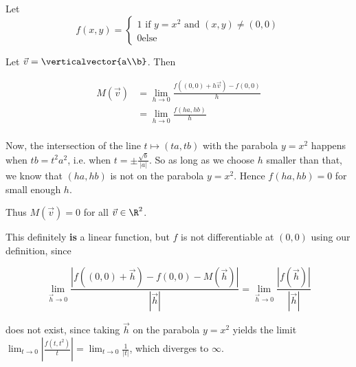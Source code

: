 \documentclass{ximera}
\begin{document}
	\begin{free-response}
	Let 
	\[f(x,y) = \begin{cases}
			1 \text{ if $y=x^2$ and $(x,y) \neq (0,0)$}\\
			0 \text{else}
		\end{cases}\]
		
	Let $\vec{v} = \verticalvector{a\\b}$.  Then 
	
	\begin{align*}
			M(\vec{v}) &= \lim_{h \to 0}\frac{f((0,0)+h\vec{v}) - f(0,0)}{h}\\
							&= \lim_{h \to 0}\frac{f(ha,hb)}{h}\\
		\end{align*}
		
		Now, the intersection of the line $t \mapsto (ta,tb)$ with the parabola $y=x^2$ happens when $tb = t^2a^2$, i.e. when $t = \pm \frac{\sqrt{b}}{|a|}$.  So as long as
		we choose $h$ smaller than that, we know that $(ha,hb)$ is not on the parabola $y=x^2$.  Hence $f(ha,hb) = 0$ for small enough $h$.
		
		Thus $M(\vec{v}) = 0$ for all $\vec{v}\in \R^2$.
		
		This definitely \textbf{is} a linear function, but $f$ is not differentiable at $(0,0)$ using our definition, since
		
		\[\lim_{\vec{h} \to 0} \frac{\left|f((0,0)+\vec{h}) - f(0,0) - M(\vec{h})\right|}{|\vec{h}|} =  \lim_{\vec{h} \to 0} \frac{\left|f(\vec{h})\right|}{|\vec{h}|} \] 
		
		does not exist, since taking $\vec{h}$ on the parabola $y=x^2$ yields the limit $\lim_{t \to 0} \left| \frac{f(t,t^2)}{t}\right| = \lim_{t \to 0} \frac{1}{|t|}$, which
		diverges to $\infty$. 
		
	\end{free-response}
\end{document}
